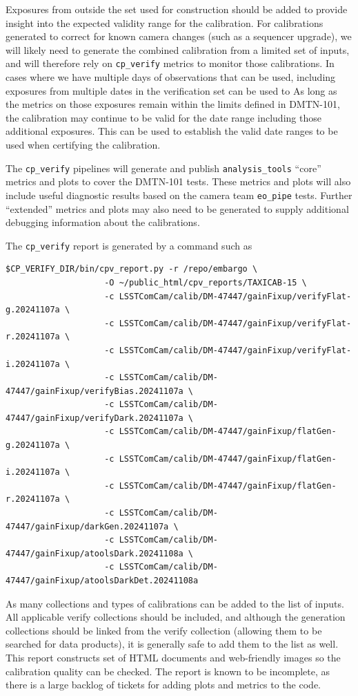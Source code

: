 \documentclass[DM,authoryear,toc]{lsstdoc}
\begin{document}
Exposures from outside the set used for construction should be added to provide insight into the expected validity range for the calibration.
For calibrations generated to correct for known camera changes (such as a sequencer upgrade), we will likely need to generate the combined calibration from a limited set of inputs, and will therefore rely on \verb|cp_verify| metrics to monitor those calibrations.
In cases where we have multiple days of observations that can be used, including exposures from multiple dates in the verification set can be used to
As long as the metrics on those exposures remain within the limits defined in DMTN-101, the calibration may continue to be valid for the date range including those additional exposures.
This can be used to establish the valid date ranges to be used when certifying the calibration.

The \verb|cp_verify| pipelines will generate and publish \verb|analysis_tools| ``core'' metrics and plots to cover the DMTN-101 tests.
These metrics and plots will also include useful diagnostic results based on the camera team \verb|eo_pipe| tests.
Further ``extended'' metrics and plots may also need to be generated to supply additional debugging information about the calibrations.

The \verb|cp_verify| report is generated by a command such as
\begin{verbatim}
$CP_VERIFY_DIR/bin/cpv_report.py -r /repo/embargo \
                    -O ~/public_html/cpv_reports/TAXICAB-15 \
                    -c LSSTComCam/calib/DM-47447/gainFixup/verifyFlat-g.20241107a \
                    -c LSSTComCam/calib/DM-47447/gainFixup/verifyFlat-r.20241107a \
                    -c LSSTComCam/calib/DM-47447/gainFixup/verifyFlat-i.20241107a \
                    -c LSSTComCam/calib/DM-47447/gainFixup/verifyBias.20241107a \
                    -c LSSTComCam/calib/DM-47447/gainFixup/verifyDark.20241107a \
                    -c LSSTComCam/calib/DM-47447/gainFixup/flatGen-g.20241107a \
                    -c LSSTComCam/calib/DM-47447/gainFixup/flatGen-i.20241107a \
                    -c LSSTComCam/calib/DM-47447/gainFixup/flatGen-r.20241107a \
                    -c LSSTComCam/calib/DM-47447/gainFixup/darkGen.20241107a \
                    -c LSSTComCam/calib/DM-47447/gainFixup/atoolsDark.20241108a \
                    -c LSSTComCam/calib/DM-47447/gainFixup/atoolsDarkDet.20241108a
\end{verbatim}
As many collections and types of calibrations can be added to the list of inputs.
All applicable verify collections should be included, and although the generation collections should be linked from the verify collection (allowing them to be searched for data products), it is generally safe to add them to the list as well.
This report constructs set of HTML documents and web-friendly images so the calibration quality can be checked.
The report is known to be incomplete, as there is a large backlog of tickets for adding plots and metrics to the code.
\end{document}
